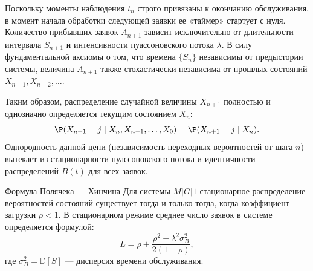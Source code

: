 \begin{note}[2]
\begin{center}
\begin{tikzpicture}
    \end{tikzpicture}
\end{center}

Поскольку моменты наблюдения $t_n$ строго привязаны к окончанию обслуживания, в момент начала обработки следующей заявки ее «таймер» стартует с нуля. Количество прибывших заявок $A_{n+1}$ зависит исключительно от длительности интервала $S_{n+1}$ и интенсивности пуассоновского потока $\lambda$. В силу фундаментальной аксиомы о том, что времена $\{S_n\}$ независимы от предыстории системы, величина $A_{n+1}$ также стохастически независима от прошлых состояний $X_{n-1}, X_{n-2}, \dots$.

Таким образом, распределение случайной величины $X_{n+1}$ полностью и однозначно определяется текущим состоянием $X_n$:
$$
\P(X_{n+1} = j \mid X_n, X_{n-1}, \dots, X_0) = \P(X_{n+1} = j \mid X_n).
$$
Однородность данной цепи (независимость переходных вероятностей от шага $n$) вытекает из стационарности пуассоновского потока и идентичности распределений $B(t)$ для всех заявок.
\end{note}

\begin{theorem}{Формула Полячека — Хинчина}
Для системы $M|G|1$ стационарное распределение вероятностей состояний существует тогда и только тогда, когда коэффициент загрузки $\rho < 1$. В стационарном режиме среднее число заявок в системе определяется формулой:
$$
L = \rho + \frac{\rho^2 + \lambda^2 \sigma_B^2}{2(1-\rho)},
$$
где $\sigma_B^2 = \mathbb{D}[S]$ — дисперсия времени обслуживания.
\end{theorem}


